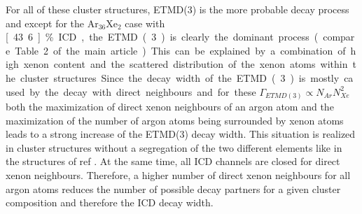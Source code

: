 For all of these cluster structures, ETMD(3) is the more probable decay process and
except for the Ar$_{36}$Xe$_2$ case with \unit[43.6]{\%} ICD, the ETMD(3) is clearly
the dominant process (compare Table 2 of the main article).
This can be explained by a combination of high xenon content and the
scattered distribution of the xenon atoms within the cluster structures.
Since the decay width of the ETMD(3) is mostly caused by the decay
with direct neighbours and for these $\Gamma_{ETMD(3)} \propto N_{Ar} N_{Xe}^2$
both the maximization of direct xenon neighbours of an argon atom and the
maximization of the number of argon atoms being surrounded by xenon atoms
leads to a strong increase of the ETMD(3) decay width. This situation is realized
in cluster structures without a segregation of the two different elements like
in the structures of ref . At the same time, all ICD channels are closed
for direct xenon neighbours. Therefore, a higher number of direct xenon neighbours
for all argon atoms reduces the number of possible decay partners for a given
cluster composition and therefore the ICD decay width.



%
